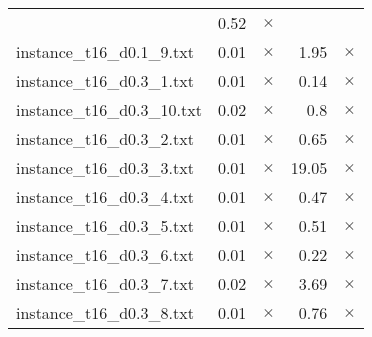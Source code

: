 \documentclass{article}
\begin{document}
\begin{center}
\begin{tabular}{lrrrr}
 & 0.52 & 
$\times$
\\
instance\_t16\_d0.1\_9.txt & 0.01 & 
$\times$
 & 1.95 & 
$\times$
\\
instance\_t16\_d0.3\_1.txt & 0.01 & 
$\times$
 & 0.14 & 
$\times$
\\
instance\_t16\_d0.3\_10.txt & 0.02 & 
$\times$
 & 0.8 & 
$\times$
\\
instance\_t16\_d0.3\_2.txt & 0.01 & 
$\times$
 & 0.65 & 
$\times$
\\
instance\_t16\_d0.3\_3.txt & 0.01 & 
$\times$
 & 19.05 & 
$\times$
\\
instance\_t16\_d0.3\_4.txt & 0.01 & 
$\times$
 & 0.47 & 
$\times$
\\
instance\_t16\_d0.3\_5.txt & 0.01 & 
$\times$
 & 0.51 & 
$\times$
\\
instance\_t16\_d0.3\_6.txt & 0.01 & 
$\times$
 & 0.22 & 
$\times$
\\
instance\_t16\_d0.3\_7.txt & 0.02 & 
$\times$
 & 3.69 & 
$\times$
\\
instance\_t16\_d0.3\_8.txt & 0.01 & 
$\times$
 & 0.76 & 
$\times$
\\
\hline\end{tabular}
\end{center}
\end{document}
